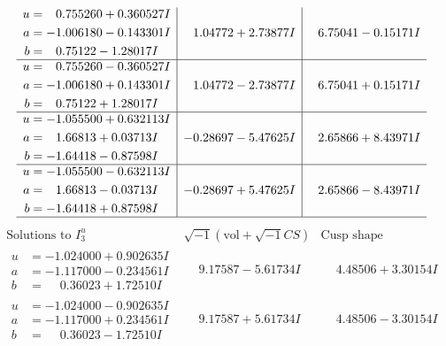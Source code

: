 \documentclass[1p]{elsarticle_modified}
\theoremstyle{definition}
\newcommand{\I}{\sqrt{-1}}
\begin{document}
$$\begin{array}{c|c|c}
\begin{aligned}
u &= \phantom{-}0.755260 + 0.360527 I \\
a &= -1.006180 - 0.143301 I \\
b &= \phantom{-}0.75122 - 1.28017 I\end{aligned}
 & \phantom{-}1.04772 + 2.73877 I & \phantom{-}6.75041 - 0.15171 I \\ \hline\begin{aligned}
u &= \phantom{-}0.755260 - 0.360527 I \\
a &= -1.006180 + 0.143301 I \\
b &= \phantom{-}0.75122 + 1.28017 I\end{aligned}
 & \phantom{-}1.04772 - 2.73877 I & \phantom{-}6.75041 + 0.15171 I \\ \hline\begin{aligned}
u &= -1.055500 + 0.632113 I \\
a &= \phantom{-}1.66813 + 0.03713 I \\
b &= -1.64418 - 0.87598 I\end{aligned}
 & -0.28697 - 5.47625 I & \phantom{-}2.65866 + 8.43971 I \\ \hline\begin{aligned}
u &= -1.055500 - 0.632113 I \\
a &= \phantom{-}1.66813 - 0.03713 I \\
b &= -1.64418 + 0.87598 I\end{aligned}
 & -0.28697 + 5.47625 I & \phantom{-}2.65866 - 8.43971 I\\
 \hline 
 \end{array}$$\newpage$$\begin{array}{c|c|c}  
\text{Solutions to }I^u_{3}& \I (\text{vol} + \sqrt{-1}CS) & \text{Cusp shape}\\
 \hline 
\begin{aligned}
u &= -1.024000 + 0.902635 I \\
a &= -1.117000 - 0.234561 I \\
b &= \phantom{-}0.36023 + 1.72510 I\end{aligned}
 & \phantom{-}9.17587 - 5.61734 I & \phantom{-}4.48506 + 3.30154 I \\ \hline\begin{aligned}
u &= -1.024000 - 0.902635 I \\
a &= -1.117000 + 0.234561 I \\
b &= \phantom{-}0.36023 - 1.72510 I\end{aligned}
 & \phantom{-}9.17587 + 5.61734 I & \phantom{-}4.48506 - 3.30154 I \\ \hline\begin{aligned}

\end{aligned}
\end{array}$$
\end{document}
